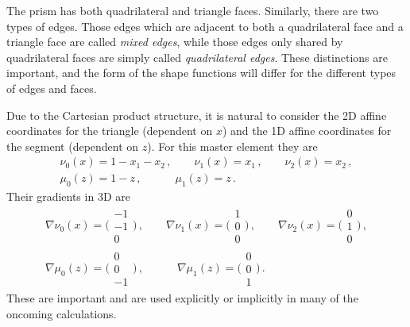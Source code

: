 
The prism has both quadrilateral and triangle faces. 
Similarly, there are two types of edges. 
Those edges which are adjacent to both a quadrilateral face and a triangle face are called \textit{mixed edges}, while those edges only shared by quadrilateral faces are simply called \textit{quadrilateral edges}. 
These distinctions are important, and the form of the shape functions will differ for the different types of edges and faces.

Due to the Cartesian product structure, it is natural to consider the 2D affine coordinates for the triangle (dependent on $x$) and the 1D affine coordinates for the segment (dependent on $z$). 
For this master element they are
\begin{equation}
	\begin{gathered}
		\nu_0(x)=1-x_1-x_2\,,\qquad\nu_1(x)=x_1\,,\qquad\nu_2(x)=x_2\,,\\
		\mu_0(z)=1-z\,,\qquad\quad\mu_1(z)=z\,.
	\end{gathered}
\end{equation}
Their gradients in 3D are
\begin{equation}
	\begin{gathered}
		\nabla\nu_0(x)=\bigg(\begin{smallmatrix}-1\\[2pt]-1\\[2pt]0\end{smallmatrix}\bigg)\,,\qquad
			\nabla\nu_1(x)=\bigg(\begin{smallmatrix}1\\[2pt]0\\[2pt]0\end{smallmatrix}\bigg)\,,\qquad
				\nabla\nu_2(x)=\bigg(\begin{smallmatrix}0\\[2pt]1\\[2pt]0\end{smallmatrix}\bigg)\,,\\
		\nabla\mu_0(z)=\bigg(\begin{smallmatrix}0\\[2pt]0\\[2pt]-1\end{smallmatrix}\bigg)\,,\qquad\quad
			\nabla\mu_1(z)=\bigg(\begin{smallmatrix}0\\[2pt]0\\[2pt]1\end{smallmatrix}\bigg)\,.
	\end{gathered}
\end{equation}
These are important and are used explicitly or implicitly in many of the oncoming calculations.

